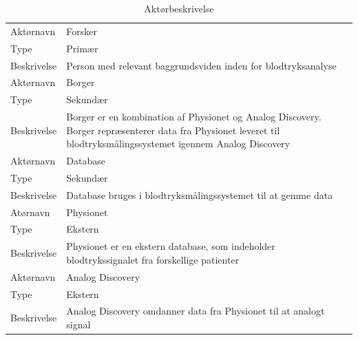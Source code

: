 \begin{table}[H]
\begin{tabularx}{\textwidth}{l X}
     Aktørnavn & Forsker \\
     Type & Primær \\
     Beskrivelse  & Person med relevant baggrundsviden inden for blodtryksanalyse \\ 
     \midrule
     Aktørnavn & Borger  \\
     Type & Sekundær \\
     Beskrivelse  & Borger er en kombination af Physionet og Analog Discovery. Borger repræsenterer data fra Physionet leveret til blodtryksmålingssystemet igennem Analog Discovery \\
     \midrule
     Aktørnavn & Database \\
     Type & Sekundær \\
     Beskrivelse  & Database bruges i blodtryksmålingssystemet til at gemme data \\ 
     \midrule
     Atørnavn & Physionet \\
     Type & Ekstern  \\
     Beskrivelse  & Physionet er en ekstern database, som indeholder blodtrykssignalet fra forskellige patienter \\
     \midrule
     Aktørnavn & Analog Discovery  \\
     Type & Ekstern \\
     Beskrivelse  & Analog Discovery omdanner data fra Physionet til at analogt signal \\                                                                                                                                                                          
     \bottomrule                                                                                                                   
    \end{tabularx}
    \caption {Aktørbeskrivelse}
    \label{tab:aktoerbeskrivelse}
	
\end{table}

